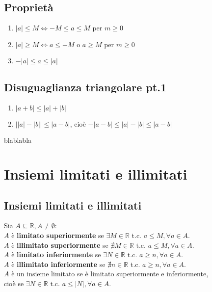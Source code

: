 \documentclass[a4paper]{article}
\begin{document}
\subsection{Proprietà}
\begin{enumerate}
	\item \(\left| a \right| \leq M \Leftrightarrow -M \leq a \leq M\) per \(m \geq 0\)
	\item \(\left| a \right| \geq M \Leftrightarrow a \leq -M\) o \(a \geq M\) per \(m \geq 0\)
	\item \(- \left| a \right| \leq a \leq \left| a \right|\)
\end{enumerate}

\subsection{Disuguaglianza triangolare pt.1}
\begin{enumerate}
	\item \(\left| a + b \right| \leq \left| a \right| + \left| b \right|\)
	\item \(\left| \left| a \right| - \left| b \right| \right| \leq \left| a - b \right|\), cioè
	\(- \left| a - b \right| \leq \left| a \right| - \left| b \right| \leq \left| a - b \right|\)
\end{enumerate}
blablabla

\newpage

\section{Insiemi limitati e illimitati}
\subsection{Insiemi limitati e illimitati}
Sia \(A \subseteq \mathbb{R}, A \neq \emptyset\): \\
\(A\) è \textbf{limitato superiormente} se \(\exists M \in \mathbb{R}\) t.c. \(a \leq M, \forall a \in A\). \\
\(A\) è \textbf{illimitato superiormente} se \(\nexists M \in \mathbb{R}\) t.c. \(a \leq M, \forall a \in A\). \\
\(A\) è \textbf{limitato inferiormente} se \(\exists N \in \mathbb{R}\) t.c. \(a \geq n, \forall a \in A\). \\
\(A\) è \textbf{illimitato inferiormente} se \(\nexists n \in \mathbb{R}\) t.c. \(a \geq n, \forall a \in A\). \\
\(A\) è un insieme limitato se è limitato superiormente e inferiormente,\\cioè se \(\exists N \in \mathbb{R}\) t.c. \(a \leq \left| N \right|, \forall a \in A\).
\end{document}
